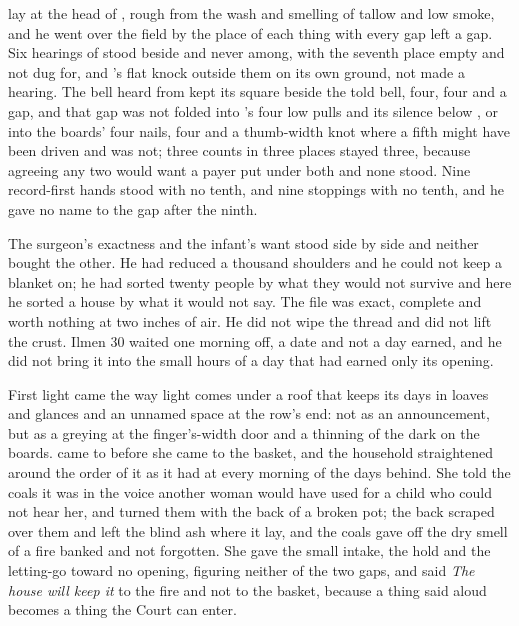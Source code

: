  lay at the head of , rough from the wash and smelling of tallow and low smoke, and he went over the field by the place of each thing with every gap left a gap. Six hearings of  stood beside and never among, with the seventh place empty and not dug for, and 's flat knock outside them on its own ground, not made a hearing. The bell heard from  kept its square beside the told bell, four, four and a gap, and that gap was not folded into 's four low pulls and its silence below , or into the boards' four nails, four and a thumb-width knot where a fifth might have been driven and was not; three counts in three places stayed three, because agreeing any two would want a payer put under both and none stood. Nine record-first hands stood with no tenth, and nine stoppings with no tenth, and he gave no name to the gap after the ninth.

The surgeon's exactness and the infant's want stood side by side and neither bought the other. He had reduced a thousand shoulders and he could not keep a blanket on; he had sorted twenty people by what they would not survive and here he sorted a house by what it would not say. The file was exact, complete and worth nothing at two inches of air. He did not wipe the thread and did not lift the crust. Ilmen 30 waited one morning off, a date and not a day earned, and he did not bring it into the small hours of a day that had earned only its opening.

\scenebreak

First light came the way light comes under a roof that keeps its days in loaves and glances and an unnamed space at the row's end: not as an announcement, but as a greying at the finger's-width door and a thinning of the dark on the boards.  came to  before she came to the basket, and the household straightened around the order of it as it had at every morning of the days behind. She told the coals it was  in the voice another woman would have used for a child who could not hear her, and turned them with the back of a broken pot; the back scraped over them and left the blind ash where it lay, and the coals gave off the dry smell of a fire banked and not forgotten. She gave the small intake, the hold and the letting-go toward no opening, figuring neither of the two gaps, and said \emph{The house will keep it} to the fire and not to the basket, because a thing said aloud becomes a thing the Court can enter.


